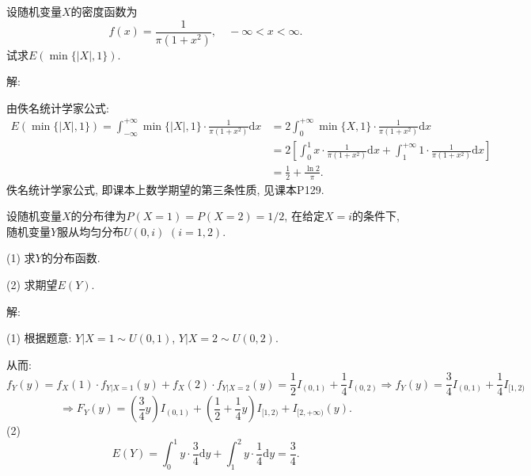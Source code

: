 \documentclass[standard]{ExBook}
\renewenvironment{shaded}{%
  \def\FrameCommand{\fboxsep=\FrameSep \colorbox{shadecolor}}%
  \MakeFramed{\advance\hsize-\width \FrameRestore}%
}{%
  \endMakeFramed
}
\begin{document}
\begin{qitems}
    \begin{bbox}
    \begin{shaded}
        \qitem
设随机变量$ X $的密度函数为
$$f(x)=\displaystyle\frac{1}{\pi(1+x^2)},\quad -\infty<x<\infty.$$
试求$E(\min\{|X|,1\})$.
    \end{shaded}
    \end{bbox}

\vspace{\dimexpr2.5cm-5em\relax}

解: 

由佚名统计学家公式:
$$
\begin{array}{ll}
E(\min\{|X|,1\})=\displaystyle\int_{-\infty}^{+\infty}\min\{|X|,1\}\cdot\frac{1}{\pi(1+x^2)}\mathrm{d}x & =\displaystyle 2\int_{0}^{+\infty}\min\{X,1\}\cdot\frac{1}{\pi(1+x^2)}\mathrm{d}x\\
& =\displaystyle 2\left[\int_{0}^{1}x\cdot\frac{1}{\pi(1+x^2)}\mathrm{d}x+\int_{1}^{+\infty}1\cdot\frac{1}{\pi(1+x^2)}\mathrm{d}x\right]\\
& =\displaystyle \frac{1}{2}+\frac{\ln 2}{\pi}.
\end{array}
$$
\textcolor{themeColor}{\selectfont {} 佚名统计学家公式, 即课本上数学期望的第三条性质, 见课本P129.}

\vspace{2.5cm-5em}

    \begin{bbox}
    \begin{shaded}
        \qitem
设随机变量$X$的分布律为$P(X=1)=P(X=2)=1/2$, 在给定$X=i$的条件下, 随机变量$Y$服从均匀分布$U(0,i)$ $(i=1,2)$.

(1) 求$Y$的分布函数.

(2) 求期望$E(Y)$.
    \end{shaded}
    \end{bbox}

\vspace{\dimexpr2.5cm-5em\relax}

解: 

(1) 根据题意: $Y|X=1\sim U(0,1)$, $Y|X=2\sim U(0,2)$.

从而:
$$f_{Y}(y)=f_{X}(1)\cdot f_{Y|X=1}(y)+f_{X}(2)\cdot f_{Y|X=2}(y)=\frac{1}{2}I_{(0,1)}+\frac{1}{4}I_{(0,2)} \Longrightarrow f_{Y}(y)=\frac{3}{4}I_{(0,1)}+\frac{1}{4}I_{[1,2)}$$
$$\Longrightarrow F_{Y}(y)=\left(\frac{3}{4}y\right)I_{(0,1)}+\left(\frac{1}{2}+\frac{1}{4}y\right)I_{[1,2)}+I_{[2,+\infty)}(y).$$
(2)
$$E(Y)=\displaystyle\int_{0}^{1}y\cdot\frac{3}{4}\mathrm{d}y+\int_{1}^{2}y\cdot\frac{1}{4}\mathrm{d}y=\frac{3}{4}.$$


\end{qitems}
\end{document}
